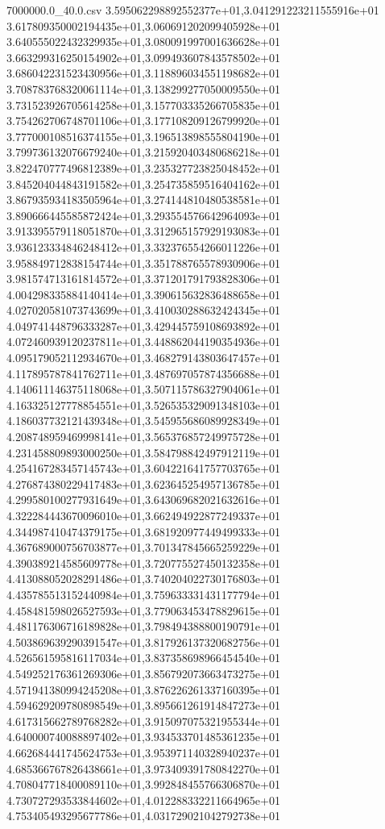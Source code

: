 \begin{filecontents*}{7000000.0_40.0.csv}
3.595062298892552377e+01,3.041291223211555916e+01
3.617809350002194435e+01,3.060691202099405928e+01
3.640555022432329935e+01,3.080091997001636628e+01
3.663299316250154902e+01,3.099493607843578502e+01
3.686042231523430956e+01,3.118896034551198682e+01
3.708783768320061114e+01,3.138299277050009550e+01
3.731523926705614258e+01,3.157703335266705835e+01
3.754262706748701106e+01,3.177108209126799920e+01
3.777000108516374155e+01,3.196513898555804190e+01
3.799736132076679240e+01,3.215920403480686218e+01
3.822470777496812389e+01,3.235327723825048452e+01
3.845204044843191582e+01,3.254735859516404162e+01
3.867935934183505964e+01,3.274144810480538581e+01
3.890666445585872424e+01,3.293554576642964093e+01
3.913395579118051870e+01,3.312965157929193083e+01
3.936123334846248412e+01,3.332376554266011226e+01
3.958849712838154744e+01,3.351788765578930906e+01
3.981574713161814572e+01,3.371201791793828306e+01
4.004298335884140414e+01,3.390615632836488658e+01
4.027020581073743699e+01,3.410030288632424345e+01
4.049741448796333287e+01,3.429445759108693892e+01
4.072460939120237811e+01,3.448862044190354936e+01
4.095179052112934670e+01,3.468279143803647457e+01
4.117895787841762711e+01,3.487697057874356688e+01
4.140611146375118068e+01,3.507115786327904061e+01
4.163325127778854551e+01,3.526535329091348103e+01
4.186037732121439348e+01,3.545955686089928349e+01
4.208748959469998141e+01,3.565376857249975728e+01
4.231458809893000250e+01,3.584798842497912119e+01
4.254167283457145743e+01,3.604221641757703765e+01
4.276874380229417483e+01,3.623645254957136785e+01
4.299580100277931649e+01,3.643069682021632616e+01
4.322284443670096010e+01,3.662494922877249337e+01
4.344987410474379175e+01,3.681920977449499333e+01
4.367689000756703877e+01,3.701347845665259229e+01
4.390389214585609778e+01,3.720775527450132358e+01
4.413088052028291486e+01,3.740204022730176803e+01
4.435785513152440984e+01,3.759633331431177794e+01
4.458481598026527593e+01,3.779063453478829615e+01
4.481176306716189828e+01,3.798494388800190791e+01
4.503869639290391547e+01,3.817926137320682756e+01
4.526561595816117034e+01,3.837358698966454540e+01
4.549252176361269306e+01,3.856792073663473275e+01
4.571941380994245208e+01,3.876226261337160395e+01
4.594629209780898549e+01,3.895661261914847273e+01
4.617315662789768282e+01,3.915097075321955344e+01
4.640000740088897402e+01,3.934533701485361235e+01
4.662684441745624753e+01,3.953971140328940237e+01
4.685366767826438661e+01,3.973409391780842270e+01
4.708047718400089110e+01,3.992848455766306870e+01
4.730727293533844602e+01,4.012288332211664965e+01
4.753405493295677786e+01,4.031729021042792738e+01

\end{filecontents*}
